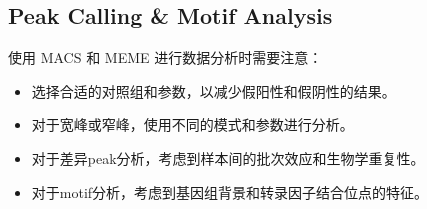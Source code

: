 \documentclass[UTF8]{ctexart}
\begin{document}
\subsection{Peak Calling \& Motif Analysis}

使用 MACS 和 MEME 进行数据分析时需要注意：
\begin{itemize}
	\item 选择合适的对照组和参数，以减少假阳性和假阴性的结果。
	\item 对于宽峰或窄峰，使用不同的模式和参数进行分析。
	\item 对于差异peak分析，考虑到样本间的批次效应和生物学重复性。
	\item 对于motif分析，考虑到基因组背景和转录因子结合位点的特征。
\end{itemize}
\end{document}

